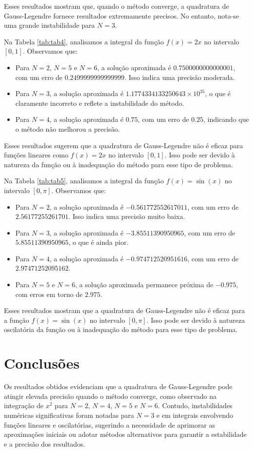 \documentclass[12pt,letterpaper]{article}
\begin{document}
Esses resultados mostram que, quando o método converge, a quadratura de Gauss-Legendre fornece resultados extremamente precisos. No entanto, nota-se uma grande instabilidade para \( N = 3 \).

Na Tabela \ref{tab:tab4}, analisamos a integral da função \( f(x) = 2x \) no intervalo \([0, 1]\). Observamos que:

\begin{itemize}
    \item Para \( N = 2 \), \( N = 5 \) e \( N = 6 \), a solução aproximada é \( 0.7500000000000001 \), com um erro de \( 0.2499999999999999 \). Isso indica uma precisão moderada.
    \item Para \( N = 3 \), a solução aproximada é \( 1.1774334133250643 \times 10^{35} \), o que é claramente incorreto e reflete a instabilidade do método.
    \item Para \( N = 4 \), a solução aproximada é \( 0.75 \), com um erro de \( 0.25 \), indicando que o método não melhorou a precisão.
\end{itemize}

Esses resultados sugerem que a quadratura de Gauss-Legendre não é eficaz para funções lineares como \( f(x) = 2x \) no intervalo \([0, 1]\). Isso pode ser devido à natureza da função ou à inadequação do método para esse tipo de problema.


Na Tabela \ref{tab:tab5}, analisamos a integral da função \( f(x) = \sin(x) \) no intervalo \([0, \pi]\). Observamos que:

\begin{itemize}
    \item Para \( N = 2 \), a solução aproximada é \(-0.561772552617011\), com um erro de \( 2.56177255261701 \). Isso indica uma precisão muito baixa.
    \item Para \( N = 3 \), a solução aproximada é \(-3.85511390950965\), com um erro de \( 5.85511390950965 \), o que é ainda pior.
    \item Para \( N = 4 \), a solução aproximada é \(-0.974712520951616\), com um erro de \( 2.97471252095162 \).
    \item Para \( N = 5 \) e \( N = 6 \), a solução aproximada permanece próxima de \(-0.975\), com erros em torno de \( 2.975 \).
\end{itemize}

Esses resultados mostram que a quadratura de Gauss-Legendre não é eficaz para a função \( f(x) = \sin(x) \) no intervalo \([0, \pi]\). Isso pode ser devido à natureza oscilatória da função ou à inadequação do método para esse tipo de problema.

\section{Conclusões}
Os resultados obtidos evidenciam que a quadratura de Gauss-Legendre pode atingir elevada precisão quando o método converge, como observado na integração de \(x^2\) para \(N=2\), \(N=4\), \(N=5\) e \(N=6\). Contudo, instabilidades numéricas significativas foram notadas para \(N=3\) e em integrais envolvendo funções lineares e oscilatórias, sugerindo a necessidade de aprimorar as aproximações iniciais ou adotar métodos alternativos para garantir a estabilidade e a precisão dos resultados.
\end{document}
